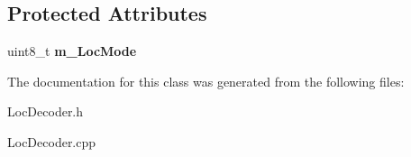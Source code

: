 \subsection*{Protected Attributes}
\begin{DoxyCompactItemize}
\item 
\mbox{\label{classTBT_1_1LocDecoder_a196fc5289b1ea2c9439b385770692c92}} 
uint8\+\_\+t {\bfseries m\+\_\+\+Loc\+Mode}
\end{DoxyCompactItemize}


The documentation for this class was generated from the following files\+:\begin{DoxyCompactItemize}
\item 
Loc\+Decoder.\+h\item 
Loc\+Decoder.\+cpp\end{DoxyCompactItemize}
